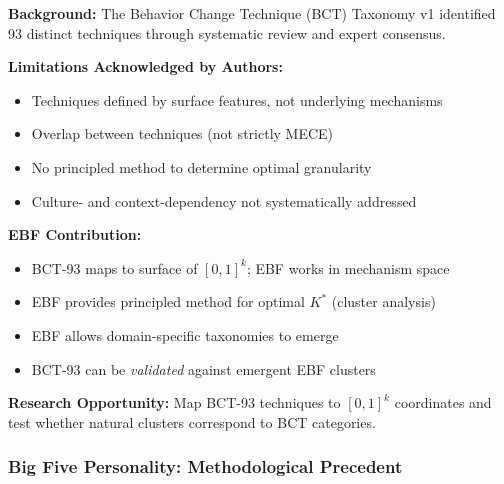 \begin{tcolorbox}[colback=blue!5!white, colframe=blue!50!black,
    title=\textbf{Critical Foundation ($\phi$): BCT Taxonomy Development}]

\textbf{Background:} The Behavior Change Technique (BCT) Taxonomy v1 \citep{michie2013behavior} identified 93 distinct techniques through systematic review and expert consensus.

\textbf{Limitations Acknowledged by Authors:}
\begin{itemize}[nosep]
    \item Techniques defined by surface features, not underlying mechanisms
    \item Overlap between techniques (not strictly MECE)
    \item No principled method to determine optimal granularity
    \item Culture- and context-dependency not systematically addressed
\end{itemize}

\textbf{EBF Contribution:}
\begin{itemize}[nosep]
    \item BCT-93 maps to surface of $[0,1]^k$; EBF works in mechanism space
    \item EBF provides principled method for optimal $K^*$ (cluster analysis)
    \item EBF allows domain-specific taxonomies to emerge
    \item BCT-93 can be \textit{validated} against emergent EBF clusters
\end{itemize}

\textbf{Research Opportunity:} Map BCT-93 techniques to $[0,1]^k$ coordinates and test whether natural clusters correspond to BCT categories.

\end{tcolorbox}

\subsubsection{Big Five Personality: Methodological Precedent}

